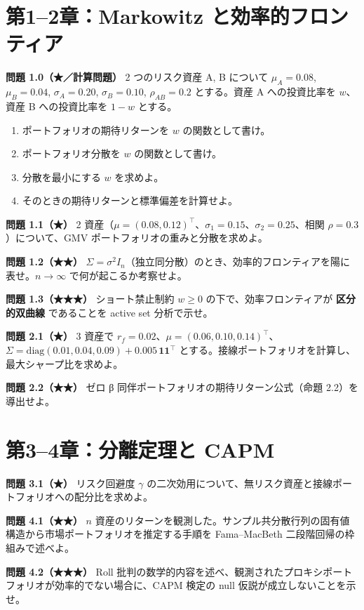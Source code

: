 \documentclass[11pt,a4paper]{report}
\begin{document}
\section{第1–2章：Markowitz と効率的フロンティア}

\textbf{問題 1.0（★／計算問題）} 2 つのリスク資産 A, B について $\mu_A = 0.08$, $\mu_B = 0.04$, $\sigma_A = 0.20$, $\sigma_B = 0.10$, $\rho_{AB} = 0.2$ とする。資産 A への投資比率を $w$、資産 B への投資比率を $1 - w$ とする。

\begin{enumerate}
\item ポートフォリオの期待リターンを $w$ の関数として書け。
\item ポートフォリオ分散を $w$ の関数として書け。
\item 分散を最小にする $w$ を求めよ。
\item そのときの期待リターンと標準偏差を計算せよ。
\end{enumerate}

\textbf{問題 1.1（★）} 2 資産（$\mu = (0.08, 0.12)^\top$、$\sigma_1 = 0.15$、$\sigma_2 = 0.25$、相関 $\rho = 0.3$）について、GMV ポートフォリオの重みと分散を求めよ。

\textbf{問題 1.2（★★）} $\Sigma = \sigma^2 I_n$（独立同分散）のとき、効率的フロンティアを陽に表せ。$n \to \infty$ で何が起こるか考察せよ。

\textbf{問題 1.3（★★★）} ショート禁止制約 $w \ge 0$ の下で、効率フロンティアが \textbf{区分的双曲線} であることを active set 分析で示せ。

\textbf{問題 2.1（★）} 3 資産で $r_f = 0.02$、$\mu = (0.06, 0.10, 0.14)^\top$、$\Sigma = \mathrm{diag}(0.01, 0.04, 0.09) + 0.005\, \mathbf{1}\mathbf{1}^\top$ とする。接線ポートフォリオを計算し、最大シャープ比を求めよ。

\textbf{問題 2.2（★★）} ゼロ β 同伴ポートフォリオの期待リターン公式（命題 2.2）を導出せよ。

\section{第3–4章：分離定理と CAPM}

\textbf{問題 3.1（★）} リスク回避度 $\gamma$ の二次効用について、無リスク資産と接線ポートフォリオへの配分比を求めよ。

\textbf{問題 4.1（★★）} $n$ 資産のリターンを観測した。サンプル共分散行列の固有値構造から市場ポートフォリオを推定する手順を Fama–MacBeth 二段階回帰の枠組みで述べよ。

\textbf{問題 4.2（★★★）} Roll 批判の数学的内容を述べ、観測されたプロキシポートフォリオが効率的でない場合に、CAPM 検定の null 仮説が成立しないことを示せ。
\end{document}
